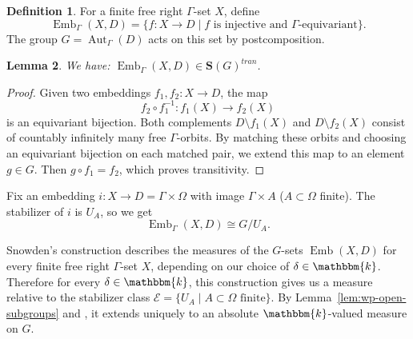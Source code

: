 \documentclass[11pt,a4paper]{amsart}
\theoremstyle{plain}%
\newtheorem{lemma}{Lemma}[subsection]
\theoremstyle{definition}
\newtheorem{definition}[lemma]{Definition}
\theoremstyle{remark}
\newcommand{\kk}{\mathbbm{k}}
\newcommand{\Emb}{\operatorname{Emb}}
\newcommand{\Set}[1]{\mathbf{S}(#1)}
\begin{document}
\begin{definition}
   For a finite free right $\Gamma$-set $X$,
define
\[
  \Emb_\Gamma(X,D)
  =\{f:X\to D\mid f \text{ is injective and }
       \Gamma\text{-equivariant}\}.
\] 
The group $G=\operatorname{Aut}_\Gamma(D)$ acts on this set by
postcomposition.
\end{definition}


\begin{lemma}
    We have: $  \Emb_\Gamma(X,D) \in \Set{G}^{tran}$.
\end{lemma}
\begin{proof}
    Given two embeddings
$f_1,f_2:X\to D$, the map
\[
  f_2\circ f_1^{-1}:f_1(X)\longrightarrow f_2(X)
\]
is an equivariant bijection. Both complements
$D\setminus f_1(X)$ and $D\setminus f_2(X)$ consist of countably
infinitely many free $\Gamma$-orbits. By matching these orbits
and choosing an equivariant bijection on each matched pair,
we extend this map to an element $g\in G$. Then
$g\circ f_1=f_2$, which proves transitivity.
\end{proof}

Fix an embedding $i:X\to D=\Gamma\times \Omega$ with image $\Gamma\times A$ ($A\subset\Omega$ finite). The stabilizer of $i$ is $U_A$, so we get
\[
  \operatorname{Emb}_\Gamma(X,D)\cong G/U_A.
\]


Snowden's construction
\cite[Construction~6.7 and Proposition~6.9]{Snowden-Knop} describes the measures of the $G$-sets $\Emb(X, D)$ for every finite free right $\Gamma$-set $X$, depending on our choice of
$\delta \in \kk$. Therefore for every $\delta\in \kk$, this construction
 gives us a measure
relative to the stabilizer class
$\mathcal E=\{U_A\mid A\subset\Omega\text{ finite}\}$. By Lemma~\ref{lem:wp-open-subgroups} and
\cite[\S3.4(d)]{HS-oligomorphic}, it extends uniquely to an absolute $\kk$-valued
measure on $G$.
\end{document}
